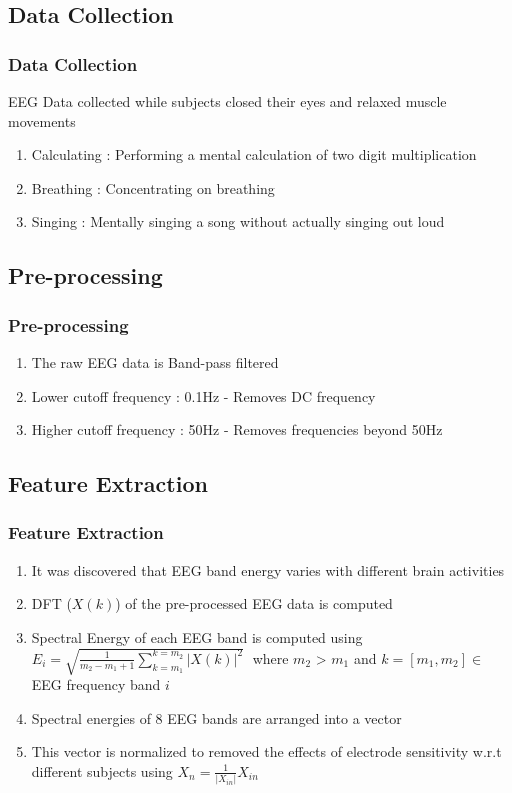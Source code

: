 \documentclass[unknownkeysallowed]{beamer}
\begin{document}
\subsection{Data Collection}
\begin{frame}
	\frametitle{Data Collection}
    EEG Data collected while subjects closed their eyes and relaxed muscle movements
    \pause
    \begin{enumerate}
    \item Calculating : Performing a mental calculation of two digit multiplication
    \pause
    \item Breathing : Concentrating on breathing
    \pause
	\item Singing : Mentally singing a song without actually singing out loud\\
    \end{enumerate}
\end{frame}
\subsection{Pre-processing}
\begin{frame}
	\frametitle{Pre-processing}
    \begin{enumerate}
    \item The raw EEG data is Band-pass filtered \\
    \pause
    \item Lower cutoff frequency : 0.1Hz - Removes DC frequency\\
    \pause
    \item Higher cutoff frequency : 50Hz - Removes frequencies beyond 50Hz
    \end{enumerate}

\end{frame}

\subsection{Feature Extraction}
\begin{frame}
	\frametitle{Feature Extraction}
	\begin{enumerate}
    \item It was discovered that EEG band energy varies with different brain activities
    \pause
    \item DFT ($X(k)$) of the pre-processed EEG data is computed
    \pause
	\item Spectral Energy of each EEG band is computed using $E_i = \sqrt{\frac{1}{m_2 - m_1 + 1} \sum_{k=m_1}^{k=m_2} \left | X(k) \right | ^2} \;$ where $m_2$ > $m_1$ and $k=[m_1,m_2] \in $ EEG frequency band $i$
    \pause
    \item Spectral energies of 8 EEG bands are arranged into a vector
    \pause
    \item This vector is normalized to removed the effects of electrode sensitivity w.r.t different subjects using $X_{n} = \frac{1}{\left | X_{in} \right |} X_{in}$
	\end{enumerate}
\end{frame}
\end{document}
